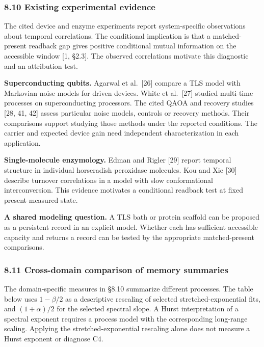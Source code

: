 \documentclass[
]{article}
\begin{document}
\hypertarget{existing-experimental-evidence}{%
\subsubsection{8.10 Existing experimental
evidence}\label{existing-experimental-evidence}}

The cited device and enzyme experiments report system-specific
observations about temporal correlations. The conditional implication is
that a matched-present readback gap gives positive conditional mutual
information on the accessible window {[}1, §2.3{]}. The observed
correlations motivate this diagnostic and an attribution test.

\textbf{Superconducting qubits.} Agarwal et al.~{[}26{]} compare a TLS
model with Markovian noise models for driven devices. White et
al.~{[}27{]} studied multi-time processes on superconducting processors.
The cited QAOA and recovery studies {[}28, 41, 42{]} assess particular
noise models, controls or recovery methods. Their comparisons support
studying those methods under the reported conditions. The carrier and
expected device gain need independent characterization in each
application.

\textbf{Single-molecule enzymology.} Edman and Rigler {[}29{]} report
temporal structure in individual horseradish peroxidase molecules. Kou
and Xie {[}30{]} describe turnover correlations in a model with slow
conformational interconversion. This evidence motivates a conditional
readback test at fixed present measured state.

\textbf{A shared modeling question.} A TLS bath or protein scaffold can
be proposed as a persistent record in an explicit model. Whether each
has sufficient accessible capacity and returns a record can be tested by
the appropriate matched-present comparisons.

\hypertarget{cross-domain-comparison-of-memory-summaries}{%
\subsubsection{8.11 Cross-domain comparison of memory
summaries}\label{cross-domain-comparison-of-memory-summaries}}

The domain-specific measures in §8.10 summarize different processes. The
table below uses \(1-\beta/2\) as a descriptive rescaling of selected
stretched-exponential fits, and \((1+\alpha)/2\) for the selected
spectral slope. A Hurst interpretation of a spectral exponent requires a
process model with the corresponding long-range scaling. Applying the
stretched-exponential rescaling alone does not measure a Hurst exponent
or diagnose C4.
\end{document}
